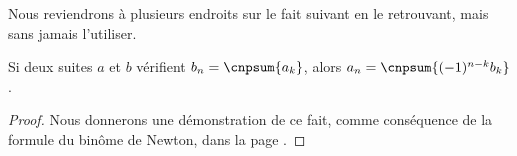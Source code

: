 Nous reviendrons à plusieurs endroits sur le fait suivant en le retrouvant, mais sans jamais l'utiliser.


\begin{fact} \label{pascal-inv}
	Si deux suites $a$ et $b$ vérifient
    $b_n = \cnpsum{a_k}$,
    alors
    $a_n = \cnpsum{(-1)^{n-k} b_k}$.
\end{fact}


\begin{proof}
	Nous donnerons une démonstration de ce fait, comme conséquence de la formule du binôme de Newton, dans la  page \pageref{easy-pascal-inv}.
\end{proof}
